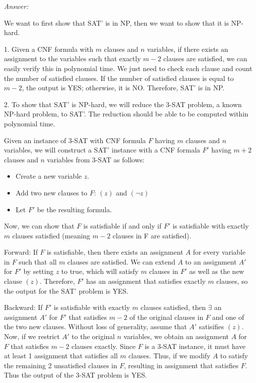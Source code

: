 \documentclass[12pt]{article}
\begin{document}
\textit{Answer: }

We want to first show that SAT' is in NP, then we want to show that it is NP-hard.

1. Given a CNF formula with $m$ clauses and $n$ variables, if there exists an assignment to the variables such that exactly $m-2$ clauses are satisfied, we can easily verify this in polynomial time. We just need to check each clause and count the number of satisfied clauses. If the number of satisfied clauses is equal to $m-2$, the output is YES; otherwise, it is NO. Therefore, SAT' is in NP.

2. To show that SAT' is NP-hard, we will reduce the 3-SAT problem, a known NP-hard problem, to SAT'. The reduction should be able to be computed within polynomial time.

Given an instance of 3-SAT with CNF formula $F$ having $m$ clauses and $n$ variables, we will construct a SAT' instance with a CNF formala $F'$ having $m+2$ clauses and $n$ variables from 3-SAT as follows:
\begin{itemize}
    \item Create a new variable $z$.
    \item Add two new clauses to $F$: $(z)$ and $(\neg z)$
    \item Let $F'$ be the resulting formula. 
\end{itemize}

Now, we can show that $F$ is satisfiable if and only if $F'$ is satisfiable with exactly $m$ clauses satisfied (meaning $m-2$ clauses in F are satisfied).

Forward: If $F$ is satisfiable, then there exists an assignment $A$ for every variable in $F$ such that all $m$ clauses are satisfied. We can extend $A$ to an assignment $A'$ for $F'$ by setting $z$ to true, which will satisfy $m$ clauses in $F'$ as well as the new clause $(z)$. Therefore, $F'$ has an assignment that satisfies exactly $m$ clauses, so the output for the SAT' problem is YES.

Backward: If $F'$ is satisfiable with exactly $m$ clauses satisfied, then $\exists$ an assignment $A'$ for $F'$ that satisfies $m-2$ of the original clauses in $F$ and one of the two new clauses. Without loss of generality, assume that $A'$ satisifies $(z)$. Now, if we restrict $A'$ to the original $n$ variables, we obtain an assignment $A$ for $F$ that satisfies $m-2$ clauses exactly. Since $F$ is a 3-SAT instance, it must have at least 1 assignment that satisfies all $m$ clauses. Thus, if we modify $A$ to satisfy the remaining 2 unsatisfied clauses in $F$, resulting in assignment that satisfies $F$. Thus the output of the 3-SAT problem is YES.
\end{document}
